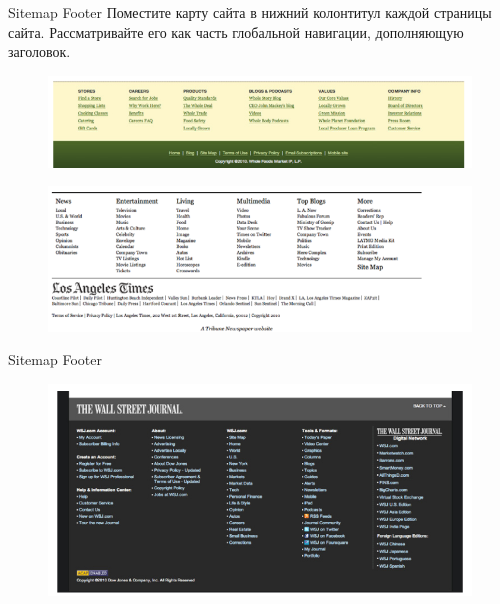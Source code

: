 \documentclass{beamer}
\begin{document}
\begin{frame}[t]{Sitemap Footer}
	Поместите карту сайта в нижний колонтитул каждой страницы сайта. Рассматривайте его как часть глобальной навигации, дополняющую заголовок.
	\begin{figure}[h]
		\centering
		\includegraphics[scale=0.5]{images/lec07-pic39.png}
	\end{figure}
	\begin{figure}[h]
		\centering
		\includegraphics[scale=0.5]{images/lec07-pic41.png}
	\end{figure}	
\end{frame}	

\begin{frame}[t]{Sitemap Footer}
	\begin{figure}[h]
		\centering
		\includegraphics[scale=0.5]{images/lec07-pic40.png}
	\end{figure}	
\end{frame}	
\end{document}
